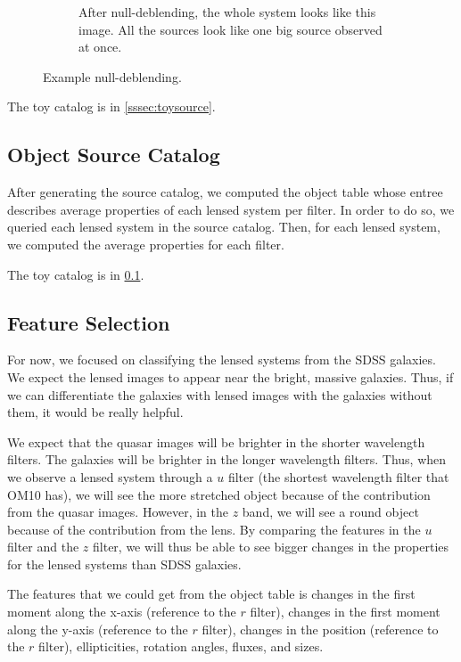 \documentclass[\docopts]{\docclass}
\begin{document}
\begin{figure}
\begin{subfigure}[bt]{0.48\linewidth}
        \caption{After null-deblending, the whole system looks like this image. All the sources look like one big source observed at once.                                                                                                                                                                                 }
    \end{subfigure}
    \caption{Example null-deblending.}
    \label{fig:null-deblend}
\end{figure}

The toy catalog is in \ref{sssec:toysource}.

\subsection{Object Source Catalog}
\label{sssec:objectsource}

After generating the source catalog, we computed the object table whose entree describes average properties of each lensed system per filter. In order to do so, we queried each lensed system in the source catalog. Then, for each lensed system, we computed the average properties for each filter.

The toy catalog is in \ref{sssec:objectsource}.

\subsection{Feature Selection}
\label{subsec:feature}

For now, we focused on classifying the lensed systems from the SDSS galaxies. We expect the lensed images to appear near the bright, massive galaxies. Thus, if we can differentiate the galaxies with lensed images with the galaxies without them, it would be really helpful.

We expect that the quasar images will be brighter in the shorter wavelength filters. The galaxies will be brighter in the longer wavelength filters. Thus, when we observe a lensed system through a $u$ filter (the shortest wavelength filter that OM10 has), we will see the more stretched object because of the contribution from the quasar images. However, in the $z$ band, we will see a round object because of the contribution from the lens. By comparing the features in the $u$ filter and the $z$ filter, we will thus be able to see bigger changes in the properties for the lensed systems than SDSS galaxies.

The features that we could get from the object table is changes in the first moment along the x-axis (reference to the $r$ filter), changes in the first moment along the y-axis (reference to the $r$ filter), changes in the position (reference to the $r$ filter), ellipticities, rotation angles, fluxes, and sizes.
\end{document}
